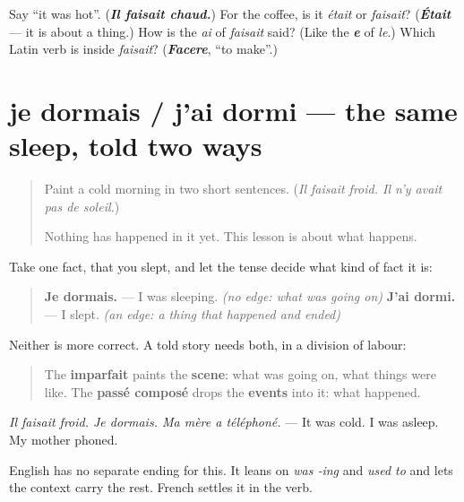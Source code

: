 \begin{tcolorbox}[breakable,colback=teal!4,colframe=teal!35!black,title={Before you move on}]
Say \textquotedblleft{}it was hot\textquotedblright{}. (\emph{\textbf{Il faisait chaud.}}) For the coffee, is it \emph{était} or \emph{faisait}? (\emph{\textbf{Était}} — it is about a thing.) How is the \emph{ai} of \emph{faisait} said? (Like the \emph{\textbf{e}} of \emph{le}.) Which Latin verb is inside \emph{faisait}? (\emph{\textbf{Facere}}, \textquotedblleft{}to make\textquotedblright{}.)
\end{tcolorbox}
\section[je dormais / j'ai dormi]{je dormais / j'ai dormi — the same sleep, told two ways}

\label{lesson:FR-C258-dormais-dormi}



\begin{quote}
Paint a cold morning in two short sentences. (\emph{Il faisait froid. Il n'y avait pas de soleil.})

Nothing has happened in it yet. This lesson is about what happens.
\end{quote}

\begin{grammarlens}[title={Grammar Lens: the scene and the events}]
Take one fact, that you slept, and let the tense decide what kind of fact it is:

\begin{quote}
\textbf{Je dormais.} — I was sleeping. \emph{(no edge: what was going on)} \textbf{J'ai dormi.} — I slept. \emph{(an edge: a thing that happened and ended)}
\end{quote}

Neither is more correct. A told story needs both, in a division of labour:

\begin{quote}
The \textbf{imparfait} paints the \textbf{scene}: what was going on, what things were like. The \textbf{passé composé} drops the \textbf{events} into it: what happened.
\end{quote}

\emph{Il faisait froid. Je dormais. Ma mère a téléphoné.} — It was cold. I was asleep. My mother phoned.

English has no separate ending for this. It leans on \emph{was ‑ing} and \emph{used to} and lets the context carry the rest. French settles it in the verb.
\end{grammarlens}

